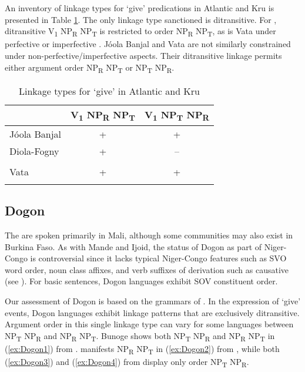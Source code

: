 \documentclass[output=paper,colorlinks,citecolor=brown]{langscibook}
\begin{document}
An inventory of linkage types for ‘give’ predications in Atlantic and Kru is presented in Table \ref{tab:LinkageAtl}. The only linkage type sanctioned is ditransitive. For , ditransitive V\textsubscript{1} NP\textsubscript{R} NP\textsubscript{T} is restricted to order NP\textsubscript{R} NP\textsubscript{T}, as is Vata under perfective or imperfective . Jóola Banjal and Vata are not similarly constrained under non-perfective/imperfective aspects. Their ditransitive linkage permits either argument order NP\textsubscript{R} NP\textsubscript{T} or NP\textsubscript{T} NP\textsubscript{R}.

\vfill
\begin{table}[H]
\caption{Linkage types for ‘give’ in Atlantic and Kru}
\label{tab:LinkageAtl}
 \begin{tabular}{lcc}
  \lsptoprule
 &  V\textsubscript{1} NP\textsubscript{R} NP\textsubscript{T}	&V\textsubscript{1} NP\textsubscript{T} NP\textsubscript{R} 	\\
  \midrule
Jóola Banjal &	+ &	+\\
Diola-Fogny &	+&--	\\
&& \\
Vata &+&+ \\
  \lspbottomrule
 \end{tabular}
\end{table}
\vfill\pagebreak


\subsection{Dogon}

The  are spoken primarily in Mali, although some communities may also exist in Burkina Faso. As with Mande and Ijoid, the status of Dogon as part of Niger-Congo is controversial since it lacks typical Niger-Congo features such as SVO word order, noun class affixes, and verb suffixes of derivation such as causative (see \citealt{WilliamsonBlench2000}). For basic sentences, Dogon languages exhibit SOV constituent order.

Our assessment of Dogon is based on the grammars of \citet{Heath2016, Heath2017a, Heath2017b, Heath2017c}. In the expression of ‘give’ events, Dogon languages exhibit linkage patterns that are exclusively ditransitive. Argument order in this single linkage type can vary for some languages between NP\textsubscript{T} NP\textsubscript{R} and NP\textsubscript{R} NP\textsubscript{T}. Bunoge shows both NP\textsubscript{T} NP\textsubscript{R} and NP\textsubscript{R} NP\textsubscript{T} in (\ref{ex:Dogon1}) from \citet{Heath2017a}.  manifests NP\textsubscript{R} NP\textsubscript{T} in (\ref{ex:Dogon2}) from \citet{Heath2016}, while both  (\ref{ex:Dogon3}) and  (\ref{ex:Dogon4}) from \citet{Heath2017c} display only order NP\textsubscript{T} NP\textsubscript{R}.
\end{document}
